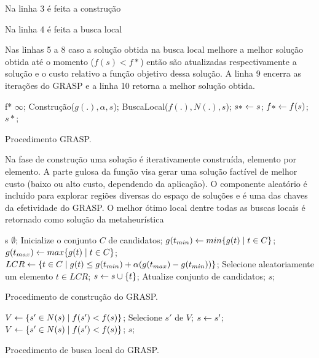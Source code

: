 Na linha 3 é feita a construção 

Na linha 4 é feita a busca local

Nas linhas 5 a 8 caso a solução obtida na busca local melhore a melhor solução obtida até o momento ($f(s) < f{*}$) então são atualizadas respectivamente a solução e o custo relativo a função objetivo dessa solução. 
A linha 9 encerra as iterações do GRASP e a linha 10 retorna a melhor solução obtida.

\begin{pgrm}
\begin{programma}
\STATE f{*} \GETS $\infty$;
\STATE Construção($g(.), \alpha, s$);
\STATE BuscaLocal($f(.),N(.),s$);
\STATE $s{*} \leftarrow s$;
\STATE $f{*} \leftarrow f(s)$;
\ENDIF
\ENDFOR
\STATE\RETURN $s{*}$;
\ENDALGORITHM
\end{programma}
\caption{Procedimento GRASP.}\label{alg:grasp}
\end{pgrm}

Na fase de construção uma solução é iterativamente construída, elemento por elemento. A parte gulosa da função visa gerar uma solução factível de melhor custo (baixo ou alto custo, dependendo da aplicação). O componente aleatório é incluído para explorar
regiões diversas do espaço de soluções e é uma das chaves da efetividade do GRASP.
O melhor ótimo local dentre todas as buscas locais é retornado como solução da metaheurística

\begin{pgrm}
\begin{programma}
\STATE s \GETS $\emptyset$;
\STATE Inicialize o conjunto $C$ de candidatos;
\STATE $g(t_{min}) \leftarrow min\{g(t) \mid t \in C\}$;
\STATE $g(t_{max}) \leftarrow max\{g(t) \mid t \in C\}$;
\STATE $LCR \leftarrow \{t \in C \mid g(t) \leq g(t_{min}) + \alpha(g(t_{max}) - g(t_{min}))\}$;
\STATE Selecione aleatoriamente um elemento $t \in LCR$;
\STATE $s \leftarrow s \cup \{t\}$;
\STATE Atualize conjunto de candidatos;
\ENDWHILE
\STATE\RETURN $s$;
\ENDALGORITHM
\end{programma}
\caption{Procedimento de construção do GRASP.}\label{alg:graspcons}
\end{pgrm}

\begin{pgrm}
\begin{programma}
\STATE $V \leftarrow \{s{'} \in N(s) \mid f(s{'}) < f(s)\}$;
\STATE Selecione $s{'}$ de $V$;
\STATE $s \leftarrow s{'}$;
\STATE $V \leftarrow \{s{'} \in N(s) \mid f(s{'}) < f(s)\}$;
\ENDWHILE
\STATE\RETURN $s$;
\ENDALGORITHM
\end{programma}
\caption{Procedimento de busca local do GRASP.}\label{alg:grasplocal}
\end{pgrm}

